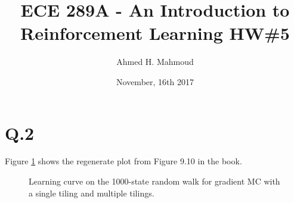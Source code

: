 \documentclass[12pt] {article}
\begin{document}
\title{ECE 289A - An Introduction to Reinforcement Learning HW\#5}

\author{Ahmed H. Mahmoud}
\date{November, 16th 2017} 
\maketitle

\section*{Q.2}
Figure \ref{fig:b} shows the regenerate plot from Figure 9.10 in the book. 

\begin{figure}[!tbh]
\centering        
   \caption{Learning curve on the 1000-state random walk for gradient MC with a single tiling and multiple tilings.}
   \label{fig:b}
\end{figure}
\end{document}
